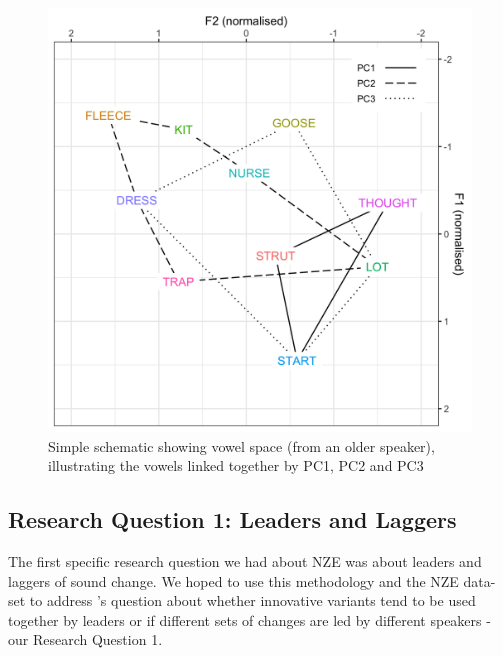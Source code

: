 \documentclass[review]{elsarticle} %
\begin{document}
\begin{figure}[!t]
\includegraphics[width=\textwidth]{Figures/summary_PC.png}
\caption{Simple schematic showing vowel space (from an older speaker), illustrating the vowels linked together by PC1, PC2 and PC3}  
\label{fig:summary}
\end{figure}


\subsection{Research Question 1: Leaders and Laggers}

The first specific research question we had about NZE was about leaders and laggers of sound change.  We hoped to use this methodology and the NZE data-set to address
 \cite{guy2016linguistic}'s question about whether innovative variants tend to be used together by leaders or if different sets of changes are led by different speakers - our Research Question 1.


\end{document}
